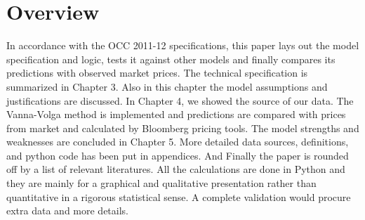 \chapter{Overview}
In accordance with the OCC 2011-12 specifications, this paper lays out the model specification and logic, tests it against other models and finally compares its predictions with observed market prices. 
\newline
\newline
The technical specification is summarized in Chapter 3. Also in this chapter the model assumptions and justifications are discussed.
In Chapter 4, we showed the source of our data. The Vanna-Volga method is implemented and predictions are compared with prices from market and calculated by Bloomberg pricing tools.
The model strengths and weaknesses are concluded in Chapter 5. More detailed data sources, definitions, and python code has been put in appendices. And Finally the paper is rounded off by a list of relevant literatures. \newline
\newline
All the calculations are done in Python and they are mainly for a graphical and qualitative presentation rather than quantitative in a rigorous statistical sense. A complete validation would procure extra data and more details.